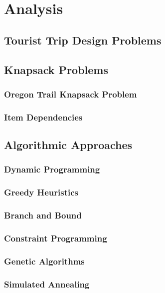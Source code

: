 \chapter{Analysis}\label{chapter:analysis}

\section{Tourist Trip Design Problems}

\section{Knapsack Problems}
\subsection{Oregon Trail Knapsack Problem}
\subsection{Item Dependencies}

\section{Algorithmic Approaches}
\subsection{Dynamic Programming}
\subsection{Greedy Heuristics}
\subsection{Branch and Bound}
\subsection{Constraint Programming}
\subsection{Genetic Algorithms}
\subsection{Simulated Annealing}


